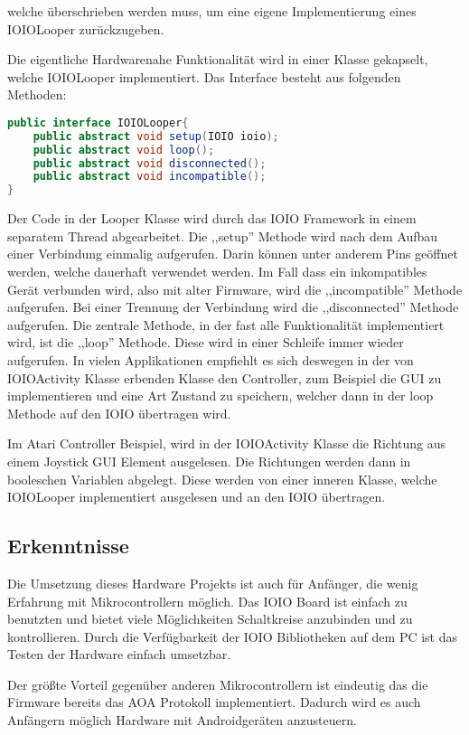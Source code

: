 \documentclass[12pt,journal,compsoc]{IEEEtran}
\begin{document}
welche überschrieben werden muss, um eine eigene Implementierung eines IOIOLooper zurückzugeben.

Die eigentliche Hardwarenahe Funktionalität wird in einer Klasse gekapselt, welche IOIOLooper implementiert. 
Das Interface besteht aus folgenden Methoden:

\begin{lstlisting}[language=Java,caption={Definitionen in IOIOLooper.java}]
public interface IOIOLooper{
	public abstract void setup(IOIO ioio);
	public abstract void loop();
	public abstract void disconnected();
	public abstract void incompatible();
}
\end{lstlisting}

Der Code in der Looper Klasse wird durch das IOIO Framework in einem separatem Thread abgearbeitet.
Die ,,setup'' Methode wird nach dem Aufbau einer Verbindung einmalig aufgerufen. Darin können unter anderem Pins geöffnet werden, welche dauerhaft verwendet werden.
Im Fall dass ein inkompatibles Gerät verbunden wird, also mit alter Firmware, wird die ,,incompatible'' Methode aufgerufen.
Bei einer Trennung der Verbindung wird die ,,disconnected'' Methode aufgerufen. 
Die zentrale Methode, in der fast alle Funktionalität implementiert wird, ist die ,,loop'' Methode.
Diese wird in einer Schleife immer wieder aufgerufen.
In vielen Applikationen empfiehlt es sich deswegen in der von IOIOActivity Klasse erbenden Klasse den Controller, zum Beispiel die GUI zu implementieren und eine Art Zustand zu speichern, welcher dann in der loop Methode auf den IOIO übertragen wird. 

Im Atari Controller Beispiel, wird in der IOIOActivity Klasse die Richtung aus einem Joystick GUI Element ausgelesen. Die Richtungen werden dann in booleschen Variablen abgelegt.
Diese werden von einer inneren Klasse, welche IOIOLooper implementiert ausgelesen und an den IOIO übertragen.

\subsection{Erkenntnisse}

Die Umsetzung dieses Hardware Projekts ist auch für Anfänger, die wenig Erfahrung mit Mikrocontrollern möglich.
Das IOIO Board ist einfach zu benutzten und bietet viele Möglichkeiten Schaltkreise anzubinden und zu kontrollieren.
Durch die Verfügbarkeit der IOIO Bibliotheken auf dem PC ist das Testen der Hardware einfach umsetzbar.

Der größte Vorteil gegenüber anderen Mikrocontrollern ist eindeutig das die Firmware bereits das AOA Protokoll implementiert. Dadurch wird es auch Anfängern möglich Hardware mit Androidgeräten anzusteuern. 
\end{document}
